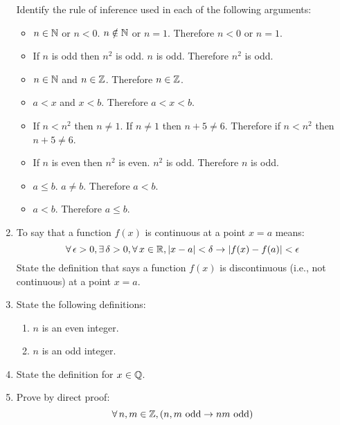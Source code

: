 \documentclass[letterpaper,12pt,fleqn]{article}
\renewcommand{\implies}{\rightarrow}
\newcommand{\e}{\epsilon}
\renewcommand{\d}{\delta}
\begin{document}
\begin{enumerate}[left=0pt]
  Identify the rule of inference used in each of the following arguments:
  \begin{itemize}
  \item[\underbar{\qquad}] \(n\in\mathbb{N}\) or \(n<0\).  \(n\notin\mathbb{N}\) or \(n=1\).  Therefore \(n<0\) or \(n=1\).
  \item[\underbar{\qquad}] If \(n\) is odd then \(n^2\) is odd.  \(n\) is odd.  Therefore \(n^2\) is odd.
  \item[\underbar{\qquad}] \(n\in\mathbb{N}\) and \(n\in\mathbb{Z}\).  Therefore \(n\in\mathbb{Z}\).
  \item[\underbar{\qquad}] \(a<x\) and \(x<b\).  Therefore \(a<x<b\).
  \item[\underbar{\qquad}] If \(n<n^2\) then \(n\ne1\).  If \(n\ne1\) then \(n+5\ne6\).  Therefore if \(n<n^2\) then
    \(n+5\ne 6\).
  \item[\underbar{\qquad}] If \(n\) is even then \(n^2\) is even.  \(n^2\) is odd.  Therefore \(n\) is odd.
  \item[\underbar{\qquad}] \(a\le b\).  \(a\ne b\).  Therefore \(a<b\).
  \item[\underbar{\qquad}] \(a<b\).  Therefore \(a\le b\).
  \end{itemize}

  \newpage

\item To say that a function \(f(x)\) is continuous at a point \(x=a\) means:
  \[\forall\,\e>0,\exists\,\d>0,\forall\,x\in\R,\abs{x-a}<\d\implies\abs{f(x)-f(a)}<\e\]
  State the definition that says a function \(f(x)\) is discontinuous (i.e., not continuous) at a point \(x=a\).

  \vspace{1.5in}

\item State the following definitions:
  \begin{enumerate}
  \item \(n\) is an even integer.

    \vspace{1.5in}

  \item \(n\) is an odd integer.
  \end{enumerate}

  \vspace{1.5in}

\item State the definition for \(x\in\mathbb{Q}\).

  \newpage

\item Prove by direct proof:
  \[\forall\,n,m\in\Z,(n,m\ \text{odd}\implies nm\ \text{odd})\]


\end{enumerate}
\end{document}

